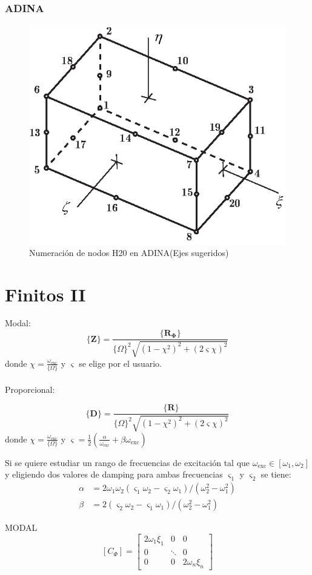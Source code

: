 \documentclass[draft,11pt, a4paper,titlepage]{article}
\newcommand{\Adina}{{\sc ADINA}}
\newcommand{\Phib}{\boldsymbol{\Phi}}
\newcommand{\COmega}{\boldsymbol{\{ } \Omega \boldsymbol{\} }}
\newcommand{\Cme}[1]{\boldsymbol{\{ }\mathbf{#1} \boldsymbol{\}} }
\newcommand{\modal}{{_{\Phib}}}
\newcommand{\dampfact}{\varsigma}
\begin{document}
%
\subsubsection*{\Adina}
\begin{figure}[htb!]
    \centering
    \includegraphics[width=.6\textwidth]{fig/H20numbering.eps}
    \caption{Numeración de nodos H20 en \Adina (Ejes sugeridos)}
    \label{fig:H20numbering}
\end{figure}

\section{Finitos II}
Modal:
\[
\Cme{Z} = \frac{\Cme{R\modal }}{{\COmega}^2 \sqrt{(1-\chi^2)^2 + (2 \dampfact \chi)^2}}
\]
donde $\chi = \frac{\omega_{\mathrm{exc}}}{\COmega}$ y $\dampfact$ se elige por el usuario.
\\
\\
Proporcional:

\[
\Cme{D} = \frac{\Cme{R }}{{\COmega}^2 \sqrt{(1-\chi^2)^2 + (2 \dampfact \chi)^2}}
\]
donde $\chi = \frac{\omega_{\mathrm{exc}}}{\COmega}$ y 
$\dampfact = \tfrac{1}{2} \left(\frac{\alpha}{\omega_{\mathrm{exc}}} +\beta \omega_{\mathrm{exc}} \right) $

Si se quiere estudiar un rango de frecuencias de excitación tal que $\omega_{\mathrm{exc}}\in [\omega_1, \omega_2]$ y eligiendo dos valores de damping para ambas frecuencias $\dampfact_1$ y $\dampfact_2$ se tiene:
\begin{align*}
	\alpha &= 2\omega_1 \omega_2 (\dampfact_1 \omega_2 -\dampfact_2 \omega_1)/(\omega_2^2 - \omega_1^2) \\ \beta &= 2(\dampfact_2\omega_2 -\dampfact_1 \omega_1)/(\omega_2^2 - \omega_1^2)
\end{align*}

MODAL
\[\left[C_{\Phi}\right]=\left[ \begin{array}{ccc}{2 \omega_{1} \xi_{1}} & {0} & {0} \\ {0} & {\ddots} & {0} \\ {0} & {0} & {2 \omega_{n} \xi_{n}}\end{array}\right]\]
\end{document}
